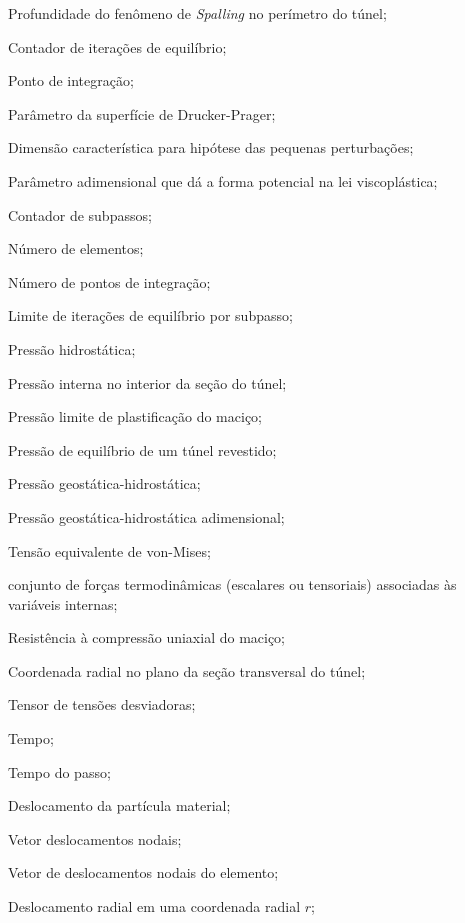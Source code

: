 \item[$h_s$]			Profundidade do fenômeno de \textit{Spalling} no perímetro do túnel;
\item[$i$] 				Contador de iterações de equilíbrio;
\item[$i_p$]			Ponto de integração;
\item[$k$] 				Parâmetro da superfície de Drucker-Prager;
\item[$l_0$] 			Dimensão característica para hipótese das pequenas perturbações;
\item[$n$] 				Parâmetro adimensional que dá a forma potencial na lei viscoplástica;
\item[$n$] 				Contador de subpassos;
\item[$n_e$] 				Número de elementos;
\item[$n_p$] 				Número de pontos de integração;
\item[$n_{eqit}$] 				Limite de iterações de equilíbrio por subpasso;
\item[$ p $]			Pressão hidrostática;
\item[$ p_i $]			Pressão interna no interior da seção do túnel;
\item[$ p_{lim} $] 		Pressão limite de plastificação do maciço;
\item[$ p_{eq} $] 		Pressão de equilíbrio de um túnel revestido;
\item[$ p_\infty $]		Pressão geostática-hidrostática;
\item[$ p_\infty^* $]	Pressão geostática-hidrostática adimensional;
\item[$ q $]	Tensão equivalente de von-Mises;
\item[$\ql$] conjunto de forças termodinâmicas (escalares ou tensoriais) associadas às variáveis internas;
\item[$ q_0 $] 			Resistência à compressão uniaxial do maciço;
\item[$ r $]			Coordenada radial no plano da seção transversal do túnel;
\item[$ \sll $]			Tensor de tensões desviadoras;
\item[$ t $] 			Tempo;
\item[$ t_p $] 			Tempo do passo;
\item[$ \ul $] 		    Deslocamento da partícula material;
\item[$ \ul $] 		    Vetor deslocamentos nodais;
\item[$ \ul_e $] 		    Vetor de deslocamentos nodais do elemento;
\item[$ u(r) $] 		Deslocamento radial em uma coordenada radial $r$;

